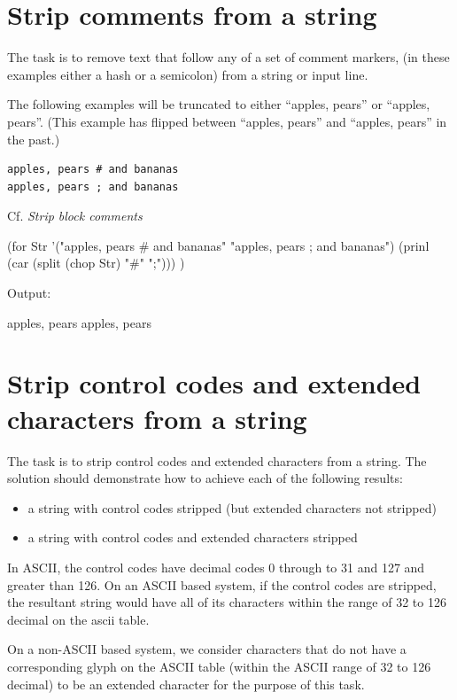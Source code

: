 \pagebreak{}
\section*{Strip comments from a string}

The task is to remove text that follow any of a set of comment markers,
(in these examples either a hash or a semicolon) from a string or input
line.

The following examples will be truncated to either ``apples, pears'' or
``apples, pears''. (This example has flipped between ``apples, pears''
and ``apples, pears'' in the past.)

\begin{verbatim}
apples, pears # and bananas
apples, pears ; and bananas
\end{verbatim}

Cf. \emph{Strip block comments}


\begin{wideverbatim}

(for Str '("apples, pears # and bananas" "apples, pears ; and bananas")
   (prinl (car (split (chop Str) "#" ";"))) )

Output:

apples, pears
apples, pears

\end{wideverbatim}

\pagebreak{}
\section*{Strip control codes and extended characters from a string}

The task is to strip control codes and extended characters from a
string. The solution should demonstrate how to achieve each of the
following results:

\begin{itemize}
\item
  a string with control codes stripped (but extended characters not
  stripped)
\item
  a string with control codes and extended characters stripped
\end{itemize}

In ASCII, the control codes have decimal codes 0 through to 31 and 127
and greater than 126. On an ASCII based system, if the control codes are
stripped, the resultant string would have all of its characters within
the range of 32 to 126 decimal on the ascii table.

On a non-ASCII based system, we consider characters that do not have a
corresponding glyph on the ASCII table (within the ASCII range of 32 to
126 decimal) to be an extended character for the purpose of this task.


